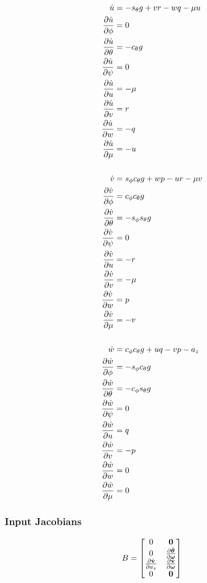 \documentclass[a4paper]{article}
\begin{document}
\begin{align*}
  \dot{u} &= -s_\theta g + vr - wq - \mu u \\
  \frac{\partial \dot{u}}{\partial \phi} &= 0 \\
  \frac{\partial \dot{u}}{\partial \theta} &= -c_\theta g \\
  \frac{\partial \dot{u}}{\partial \psi} &= 0 \\
  \frac{\partial \dot{u}}{\partial u} &= -\mu \\
  \frac{\partial \dot{u}}{\partial v} &= r \\
  \frac{\partial \dot{u}}{\partial w} &= -q \\
  \frac{\partial \dot{u}}{\partial \mu} &= -u \\
  \\
  \dot{v} &= s_\phi c_\theta g + wp - ur - \mu v \\
  \frac{\partial \dot{v}}{\partial \phi} &= c_\phi c_\theta g \\
  \frac{\partial \dot{v}}{\partial \theta} &= -s_\phi s_\theta g \\
  \frac{\partial \dot{v}}{\partial \psi} &= 0 \\
  \frac{\partial \dot{v}}{\partial u} &= -r \\
  \frac{\partial \dot{v}}{\partial v} &= -\mu \\
  \frac{\partial \dot{v}}{\partial w} &= p \\
  \frac{\partial \dot{v}}{\partial \mu} &= -v \\
  \\
  \dot{w} &= c_\phi c_\theta g + uq - vp - a_z \\
  \frac{\partial \dot{w}}{\partial \phi} &= -s_\phi c_\theta g \\
  \frac{\partial \dot{w}}{\partial \theta} &= -c_\phi s_\theta g \\
  \frac{\partial \dot{w}}{\partial \psi} &= 0 \\
  \frac{\partial \dot{w}}{\partial u} &= q \\
  \frac{\partial \dot{w}}{\partial v} &= -p \\
  \frac{\partial \dot{w}}{\partial w} &= 0 \\
  \frac{\partial \dot{w}}{\partial \mu} &= 0 \\
\end{align*}

\subsubsection{Input Jacobians}
\begin{equation}
  B =
  \begin{bmatrix}
    0 & \boldsymbol{\mathrm{0}} \\
    0 & \frac{\partial \dot{\boldsymbol{\mathrm{\theta}}}}{\partial \boldsymbol{\mathrm{\omega}}} \\
    \frac{\partial \dot{\boldsymbol{\mathrm{v}}}}{\partial a_z} & \frac{\partial
      \dot{\boldsymbol{\mathrm{v}}}}{\partial \boldsymbol{\mathrm{\omega}}} \\
    0 & \boldsymbol{\mathrm{0}} 
  \end{bmatrix}
\end{equation}
\end{document}
